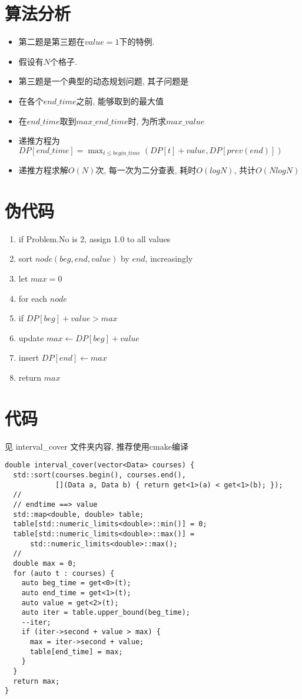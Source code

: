 \documentclass[a4paper]{article}
\begin{document}
\section{算法分析}
\begin{itemize}
  \item 第二题是第三题在$value=1$下的特例.
  \item 假设有$N$个格子.
  \item 第三题是一个典型的动态规划问题, 其子问题是
  \item 在各个$end\_time$之前, 能够取到的最大值
  \item 在$end\_time$取到$max\_end\_time$时, 为所求$max\_value$
  \item 递推方程为$DP[end\_time] = \max_{t \leq begin\_time}(DP[t]+value, DP[prev(end)]) $
  \item 递推方程求解$O(N)$次, 每一次为二分查表, 耗时$O(log N)$, 共计$O(N logN)$
\end{itemize}	

\section{伪代码}
\begin{enumerate}
  \item if Problem.No is 2, assign 1.0 to all values
  \item sort $node(beg, end, value)$ by $end$, increasingly
  \item let $max = 0$
  \item for each $node$ 
  \item \quad if $DP[beg] + value > max$ 
  \item \qquad update $max \leftarrow DP[beg] + value$
  \item \qquad insert $DP[end] \leftarrow max$ 
  \item return $max$
\end{enumerate}
\section{代码}
见 interval\_cover 文件夹内容, 推荐使用cmake编译
\begin{verbatim}
double interval_cover(vector<Data> courses) {
  std::sort(courses.begin(), courses.end(),
            [](Data a, Data b) { return get<1>(a) < get<1>(b); });
  //
  // endtime ==> value
  std::map<double, double> table;
  table[std::numeric_limits<double>::min()] = 0;
  table[std::numeric_limits<double>::max()] =
      std::numeric_limits<double>::max();
  //
  double max = 0;
  for (auto t : courses) {
    auto beg_time = get<0>(t);
    auto end_time = get<1>(t);
    auto value = get<2>(t);
    auto iter = table.upper_bound(beg_time);
    --iter;
    if (iter->second + value > max) {
      max = iter->second + value;
      table[end_time] = max;
    }
  }
  return max;
}


\end{verbatim}
\end{document}
